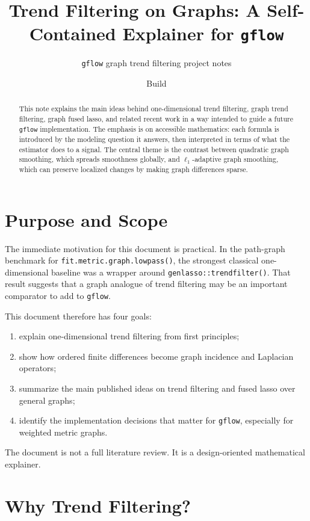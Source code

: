 \documentclass[11pt]{article}
\title{Trend Filtering on Graphs: A Self-Contained Explainer for \texttt{gflow}}
\author{\texttt{gflow} graph trend filtering project notes}
\date{Build \reportbuilddatetime}
\begin{document}
\maketitle

\begin{abstract}
This note explains the main ideas behind one-dimensional trend filtering, graph
trend filtering, graph fused lasso, and related recent work in a way intended
to guide a future \texttt{gflow} implementation.  The emphasis is on accessible
mathematics: each formula is introduced by the modeling question it answers,
then interpreted in terms of what the estimator does to a signal.  The central
theme is the contrast between quadratic graph smoothing, which spreads
smoothness globally, and \(\ell_1\)-adaptive graph smoothing, which can preserve
localized changes by making graph differences sparse.
\end{abstract}

\section{Purpose and Scope}

The immediate motivation for this document is practical.  In the path-graph
benchmark for \texttt{fit.metric.graph.lowpass()}, the strongest classical
one-dimensional baseline was a wrapper around
\texttt{genlasso::trendfilter()}.  That result suggests that a graph analogue
of trend filtering may be an important comparator to add to \texttt{gflow}.

This document therefore has four goals:
\begin{enumerate}
  \item explain one-dimensional trend filtering from first principles;
  \item show how ordered finite differences become graph incidence and
        Laplacian operators;
  \item summarize the main published ideas on trend filtering and fused lasso
        over general graphs;
  \item identify the implementation decisions that matter for \texttt{gflow},
        especially for weighted metric graphs.
\end{enumerate}

The document is not a full literature review.  It is a design-oriented
mathematical explainer.

\section{Why Trend Filtering?}
\end{document}
